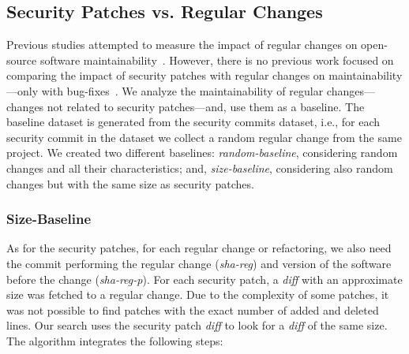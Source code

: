 \documentclass[smallextended]{svjour3}       %
\begin{document}
%
\subsection{Security Patches vs. Regular Changes}
%
Previous studies attempted to measure the impact of regular changes 
on open-source software maintainability~\cite{HEGEDUS2018313}. 
However, there is no previous work focused on comparing the impact 
of security patches with regular changes on maintainability---only
with bug-fixes~\cite{10.1145/3133956.3134072}.
We analyze the maintainability of regular changes---changes not 
related to security patches---and, use them as a baseline.
The baseline dataset is generated from the security commits dataset, i.e.,
for each security commit in the dataset we collect a random regular
change from the same project. We created two different baselines: 
\textit{random-baseline},
considering random changes and all their characteristics; and,
\textit{size-baseline}, considering also random changes
but with the same size as security patches.

\subsubsection{Size-Baseline} 

As for the security patches, for each regular change or refactoring, we also 
need the commit performing the regular change (\emph{sha-reg}) and version of 
the software before the change (\emph{sha-reg-p}). For each security patch, a 
\emph{diff} with an approximate 
size was fetched to a regular change. Due to the complexity of some patches, it was not possible 
to find patches with the exact number of added and deleted lines. 
Our search uses the security patch \emph{diff} to look for a 
\emph{diff} of the same size. The algorithm integrates the following 
steps:
\end{document}
